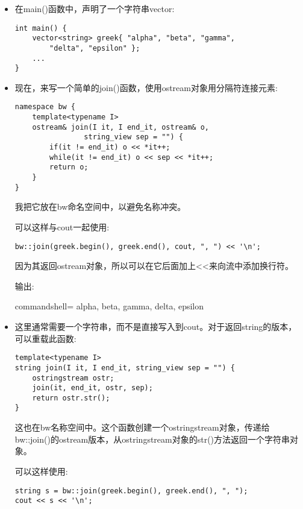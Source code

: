 \begin{itemize}
\item 
在main()函数中，声明了一个字符串vector:

\begin{lstlisting}[style=styleCXX]
int main() {
	vector<string> greek{ "alpha", "beta", "gamma",
		"delta", "epsilon" };
	...
}
\end{lstlisting}

\item 
现在，来写一个简单的join()函数，使用ostream对象用分隔符连接元素:

\begin{lstlisting}[style=styleCXX]
namespace bw {
	template<typename I>
	ostream& join(I it, I end_it, ostream& o,
				string_view sep = "") {
		if(it != end_it) o << *it++;
		while(it != end_it) o << sep << *it++;
		return o;
	}
}
\end{lstlisting}

我把它放在bw命名空间中，以避免名称冲突。

可以这样与cout一起使用:

\begin{lstlisting}[style=styleCXX]
bw::join(greek.begin(), greek.end(), cout, ", ") << '\n';
\end{lstlisting}

因为其返回ostream对象，所以可以在它后面加上<{}<来向流中添加换行符。

输出:

\begin{tcblisting}{commandshell={}}
alpha, beta, gamma, delta, epsilon
\end{tcblisting}

\item 
这里通常需要一个字符串，而不是直接写入到cout。对于返回string的版本，可以重载此函数:

\begin{lstlisting}[style=styleCXX]
template<typename I>
string join(I it, I end_it, string_view sep = "") {
	ostringstream ostr;
	join(it, end_it, ostr, sep);
	return ostr.str();
}
\end{lstlisting}

这也在bw名称空间中。这个函数创建一个ostringstream对象，传递给bw::join()的ostream版本，从ostringstream对象的str()方法返回一个字符串对象。

可以这样使用:

\begin{lstlisting}[style=styleCXX]
string s = bw::join(greek.begin(), greek.end(), ", ");
cout << s << '\n';
\end{lstlisting}


\end{itemize}

